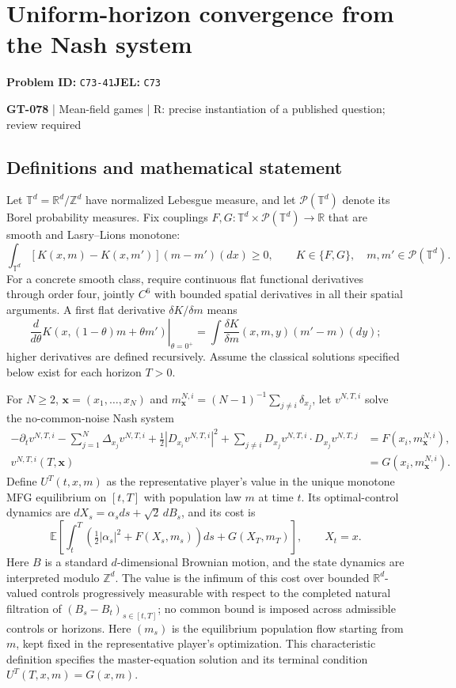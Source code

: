 \documentclass[11pt,a4paper]{article}
\begin{document}
\section*{Uniform-horizon convergence from the Nash system}
\textbf{Problem ID:} \texttt{C73-41}\quad \textbf{JEL:} \texttt{C73}\par
\label{problem:OP-0208}
\label{game:GT-078}
{\sffamily\small\color{muted}
{\small\textbf{GT-078} | Mean-field games | R: precise instantiation of a published question; review required\par}
\par}
\subsection*{Definitions and mathematical statement}
Let $\mathbb T^d=\mathbb R^d/\mathbb Z^d$ have normalized Lebesgue measure, and let $\mathcal P(\mathbb T^d)$ denote its Borel probability measures. Fix couplings $F,G:\mathbb T^d\times\mathcal P(\mathbb T^d)\to\mathbb R$ that are smooth and Lasry--Lions monotone:
\[
 \int_{\mathbb T^d}[K(x,m)-K(x,m')](m-m')(dx)\geq0,
 \qquad K\in\{F,G\},\quad m,m'\in\mathcal P(\mathbb T^d).
\]
For a concrete smooth class, require continuous flat functional derivatives through order four, jointly $C^6$ with bounded spatial derivatives in all their spatial arguments. A first flat derivative $\delta K/\delta m$ means
\[
 \left.\frac d{d\theta}K(x,(1-\theta)m+\theta m')\right|_{\theta=0^+}
 =\int\frac{\delta K}{\delta m}(x,m,y)(m'-m)(dy);
\]
higher derivatives are defined recursively. Assume the classical solutions specified below exist for each horizon $T>0$.

For $N\geq2$, $\boldsymbol x=(x_1,\ldots,x_N)$ and $m^{N,i}_{\boldsymbol x}=(N-1)^{-1}\sum_{j\ne i}\delta_{x_j}$, let $v^{N,T,i}$ solve the no-common-noise Nash system
\[
 \begin{split}
 -\partial_t v^{N,T,i}-\sum_{j=1}^N\Delta_{x_j}v^{N,T,i}
 +\tfrac12|D_{x_i}v^{N,T,i}|^2
 +\sum_{j\ne i}D_{x_j}v^{N,T,i}\cdot D_{x_j}v^{N,T,j}
 &=F(x_i,m^{N,i}_{\boldsymbol x}),\\
 v^{N,T,i}(T,\boldsymbol x)&=G(x_i,m^{N,i}_{\boldsymbol x}).
 \end{split}
\]
Define $U^T(t,x,m)$ as the representative player's value in the unique monotone MFG equilibrium on $[t,T]$ with population law $m$ at time $t$. Its optimal-control dynamics are $dX_s=\alpha_s ds+\sqrt2\,dB_s$, and its cost is
\[
 \mathbb E\!\left[\int_t^T\left(\tfrac12|\alpha_s|^2+F(X_s,m_s)\right)ds
 +G(X_T,m_T)\right],\qquad X_t=x.
\]
Here $B$ is a standard $d$-dimensional Brownian motion, and the state dynamics are interpreted modulo $\mathbb Z^d$. The value is the infimum of this cost over bounded $\mathbb R^d$-valued controls progressively measurable with respect to the completed natural filtration of $(B_s-B_t)_{s\in[t,T]}$; no common bound is imposed across admissible controls or horizons.
Here $(m_s)$ is the equilibrium population flow starting from $m$, kept fixed in the representative player's optimization. This characteristic definition specifies the master-equation solution and its terminal condition $U^T(T,x,m)=G(x,m)$.
\end{document}
